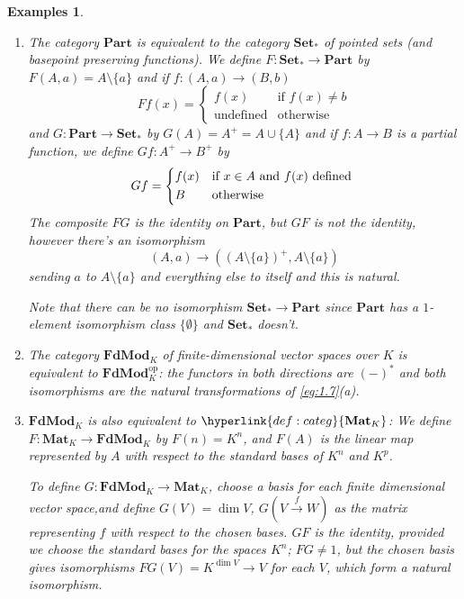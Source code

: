 \documentclass{article}
\newtheorem{nexample}[nthm]{Examples}
\begin{document}
\begin{nexample}\label{eg:1.10}\leavevmode
  \begin{enumerate}[label=(\alph*)]
    \item The category \hyperlink{def:categ}{$\mathbf{Part}$} is equivalent to the category $\mathbf{Set}_*$ of pointed sets (and basepoint preserving functions).
      We define $F: \mathbf{Set}_* \to \mathbf{Part}$ by $F(A,a) = A \setminus \{a\}$ and if $f: (A,a) \to (B,b)$
      \begin{equation*}
        Ff(x) =
        \begin{cases}
          f(x) & \text{if } f(x) \neq b \\
          \text{undefined} & \text{otherwise}
        \end{cases}
      \end{equation*}
      and
      $G : \mathbf{Part} \to \mathbf{Set}_*$ by $G(A) = A^+ = A \cup \{A\}$ and if $f: A \to B$ is a partial function, we define $Gf: A^+ \to B^+$ by
      \begin{equation*}
        Gf =
        \begin{cases*}
          f(x) & if $x \in A$ and $f(x)$ defined \\
          B & otherwise
        \end{cases*}
      \end{equation*}
      The composite $FG$ is the identity on $\mathbf{Part}$, but $GF$ is not the identity, however there's an isomorphism
      \begin{equation*}
        (A,a) \to ((A \setminus \{a\})^+, A \setminus \{a\})
      \end{equation*}
      sending $a$ to $A \setminus \{a\}$ and everything else to itself and this is natural.

      Note that there can be no isomorphism $\mathbf{Set}_* \to \mathbf{Part}$ since $\mathbf{Part}$ has a $1$-element isomorphism class $\{\emptyset\}$ and $\mathbf{Set}_*$ doesn't.
    \item The category $\mathbf{FdMod}_K$ of finite-dimensional vector spaces over $K$ is equivalent to $\mathbf{FdMod}_K^\text{op}$: the functors in both directions are $(-)^*$ and both isomorphisms are the natural transformations of \cref{eg:1.7}(a).
    \item $\mathbf{FdMod}_K$ is also equivalent to $\hyperlink{def:categ}{\mathbf{Mat}_K}$: We define $F: \mathbf{Mat}_K \to \mathbf{FdMod}_K$ by $F(n) = K^n$, and $F(A)$ is the linear map represented by $A$ with respect to the standard bases of $K^n$ and $K^p$.

      To define $G: \mathbf{FdMod}_K \to \mathbf{Mat}_K$, choose a basis for each finite dimensional vector space,and define $G(V) = \dim V$, $G(V \xrightarrow{f} W)$ as the matrix representing $f$ with respect to the chosen bases.
      $GF$ is the identity, provided we choose the standard bases for the spaces $K^n$; $FG \neq 1$, but the chosen basis gives isomorphisms $FG(V) = K^{\dim V} \to V$ for each $V$, which form a natural isomorphism.
  \end{enumerate}
\end{nexample}
\end{document}
